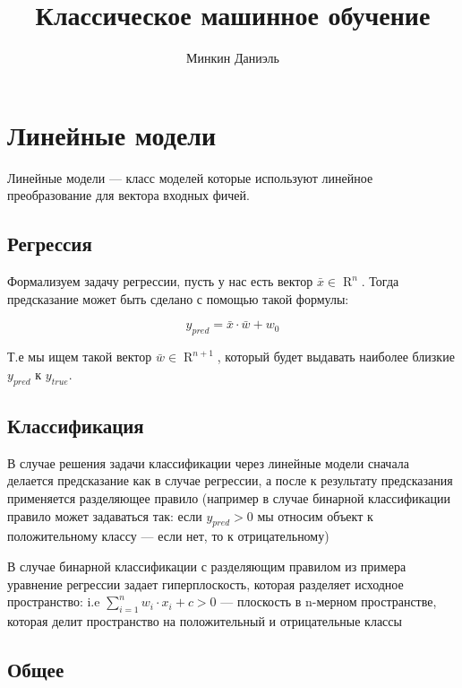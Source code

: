 \documentclass{article}
\title{Классическое машинное обучение}
\author{Минкин Даниэль}
\begin{document}
    \maketitle

    \tableofcontents %

    \section{Линейные модели}

    Линейные модели --- класс моделей которые используют линейное преобразование для вектора входных фичей.

    \subsection{Регрессия}

    Формализуем задачу регрессии, пусть у нас есть вектор $\bar{x} \in \operatorname{R}^{n}$.
    Тогда предсказание может быть сделано с помощью такой формулы:

    \begin{equation}
        y_{pred} = \bar{x} \cdot \bar{w} + w_{0}
    \end{equation}

    Т.е мы ищем такой вектор $\bar{w} \in \operatorname{R}^{n + 1}$, который будет выдавать наиболее близкие $y_{pred}$ к $y_{true}$.

    \subsection{Классификация}

    В случае решения задачи классификации через линейные модели сначала делается предсказание как в случае регрессии, а после
    к результату предсказания применяется разделяющее правило (например в случае бинарной классификации правило может задаваться так:
    если $y_{pred} > 0$ мы относим объект к положительному классу --- если нет, то к отрицательному)

    В случае бинарной классификации с разделяющим правилом из примера уравнение регрессии задает гиперплоскость,
    которая разделяет исходное пространство: i.e $\sum_{i = 1}^{n}{w_{i} \cdot x_{i}} + c > 0$ --- плоскость в n-мерном пространстве,
    которая делит пространство на положительный и отрицательные классы

    \subsection{Общее}
\end{document}
